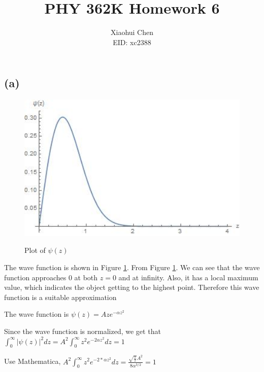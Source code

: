 \documentclass[12pt]{article}
\author{Xiaohui Chen \\EID: xc2388}
\title{PHY 362K Homework 6}
\begin{document}
\maketitle

\begin{spacing}{2.0}

\section{} %

\subsection*{(a)}

\begin{figure}
  \centering
  \includegraphics[width=5in]{out1}\\
  \caption{Plot of $\psi(z)$}\label{out1}
\end{figure}


The wave function is shown in Figure \ref{out1}. From Figure \ref{out1}. We can see that the wave function approaches $0$ at both $z=0$ and at infinity. Also, it has a local maximum value, which indicates the object getting to the highest point. Therefore this wave function is a suitable approximation

The wave function is $\psi(z)= Aze^{-\alpha z^2}$

Since the wave function is normalized, we get that $\int_{0}^{\infty} |\psi(z)|^2 dz = A^2 \int_{0}^{\infty} z^2e^{-2\alpha z^2} dz=1$

Use Mathematica, $A^2 \int_{0}^{\infty} z^2 e^{-2*\alpha z^2} dz= \frac{\sqrt{\frac{\pi }{2}} A^2}{8 \alpha ^{3/2}} = 1$


\end{spacing}
\end{document}
